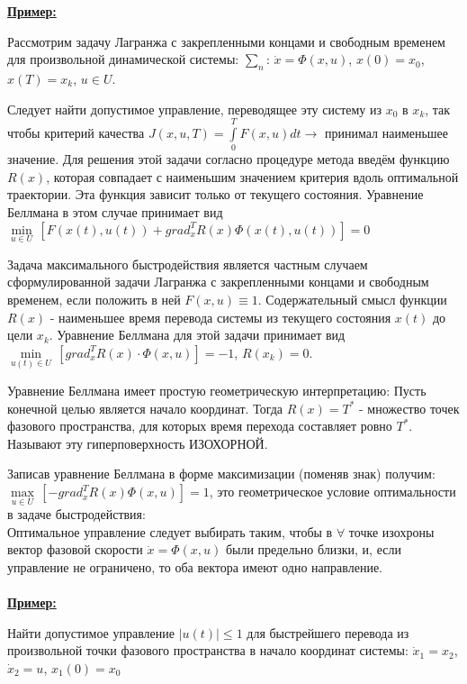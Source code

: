 \documentclass[preprint,russian,a5paper,10pt,twoside,mediummath]{ncc}
\newcommand{\ExampleMy}{\vspace{\baselineskip}\textbf{\underline{Пример:}}\nopagebreak\par}
\begin{document}
\ExampleMy Рассмотрим задачу Лагранжа с закрепленными концами и свободным временем для произвольной динамической системы: $\sum\nolimits_{n}{{}}$: $\dot{x}=\Phi \left( x,u \right)$, $x\left( 0 \right)={{x}_{0}}$, $x\left( T \right)={{x}_{k}}$, $u\in U$. 
\par Следует найти допустимое управление, переводящее эту систему из ${{x}_{0}}$ в ${{x}_{k}}$, так чтобы критерий качества $J\left( x,u,T \right)=\int\limits_{0}^{T}{F\left( x,u \right)}dt\to $ принимал наименьшее значение. Для решения этой задачи согласно процедуре метода введём функцию $R\left( x \right)$, которая совпадает с наименьшим значением критерия вдоль оптимальной траектории. Эта функция зависит только от текущего состояния. Уравнение Беллмана в этом случае принимает вид $\underset{u\in U}{\mathop{\min }}\,\left[ F\left( x\left( t \right),u\left( t \right) \right)+grad_{x}^{T}R\left( x \right)\Phi \left( x\left( t \right),u\left( t \right) \right) \right]=0$
\par Задача максимального быстродействия является частным случаем сформулированной задачи Лагранжа с закрепленными концами и свободным временем, если положить в ней $F\left( x,u \right)\equiv 1$. Содержательный смысл функции $R\left( x \right)$ - наименьшее время перевода системы из текущего состояния $x\left( t \right)$ до цели ${{x}_{k}}$. Уравнение Беллмана для этой задачи принимает вид 
$\underset{u\left( t \right)\in U}{\mathop{\min }}\,\left[ grad_{x}^{T}R\left( x \right)\cdot \Phi \left( x,u \right) \right]=-1$, $R\left( {{x}_{k}} \right)=0$.
\par Уравнение Беллмана имеет простую геометрическую интерпретацию: Пусть конечной целью является начало координат. Тогда $R\left( x \right)={{T}^{*}}$ - множество точек фазового пространства, для которых время перехода составляет ровно ${{T}^{*}}$. Называют эту гиперповерхность ИЗОХОРНОЙ.
\par Записав уравнение Беллмана в форме максимизации (поменяв знак) получим:
\\$\underset{u\in U}{\mathop{\max }}\,\left[ -grad_{x}^{T}R\left( x \right)\Phi \left( x,u \right) \right]=1$, это геометрическое условие оптимальности в задаче быстродействия:
\\Оптимальное управление следует выбирать таким, чтобы в $\forall $ точке изохроны вектор фазовой скорости $\dot{x}=\Phi \left( x,u \right)$ были предельно близки, и, если управление не ограничено, то оба вектора имеют одно направление.
\\\\\ExampleMy Найти допустимое управление $\left| u\left( t \right) \right|\le 1$ для быстрейшего перевода из произвольной точки фазового пространства в начало координат системы: ${{\dot{x}}_{1}}={{x}_{2}}$, ${{\dot{x}}_{2}}=u$, ${{x}_{1}}\left( 0 \right)={{x}_{0}}$ 
\end{document}
